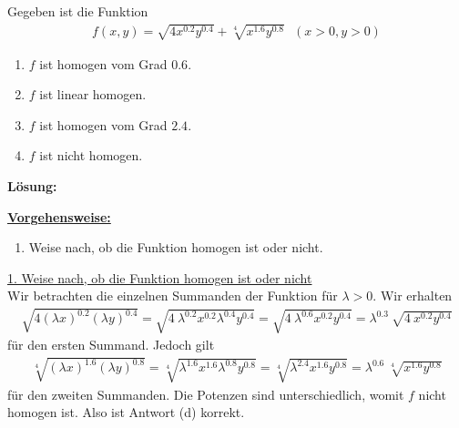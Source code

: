 \newpage

\subsection*{}
Gegeben ist die Funktion
\begin{align*}
f(x,y) = 
\sqrt{4  x^{0.2} y^{0.4}} + \sqrt[4]{x^{1.6} y^{0.8}}
\ \ \
(x>0, y>0)
\end{align*}
\renewcommand{\labelenumi}{(\alph{enumi})}
\begin{enumerate}
\item $f$ ist homogen vom Grad $0.6$.
\item $f$ ist linear homogen.
\item $f$ ist homogen vom Grad $2.4$.
\item $f$ ist nicht homogen.
\end{enumerate}

\textbf{Lösung:}
\begin{mdframed}
\underline{\textbf{Vorgehensweise:}}
\renewcommand{\labelenumi}{\theenumi.}
\begin{enumerate}
\item Weise nach, ob die Funktion homogen ist oder nicht.
\end{enumerate}
\end{mdframed}

\underline{1. Weise nach, ob die Funktion homogen ist oder nicht}\\
Wir betrachten die einzelnen Summanden der Funktion für $\lambda > 0$. Wir erhalten
\begin{align*}
\sqrt{4 (\lambda x)^{0.2} (\lambda y)^{0.4}}
= \sqrt{4 \ \lambda^{0.2} x^{0.2} \lambda^{0.4} y^{0.4}}
= \sqrt{4 \ \lambda^{0.6} x^{0.2}  y^{0.4}}
= \lambda^{0.3} \ \sqrt{4 \  x^{0.2}  y^{0.4}}
\end{align*}
für den ersten Summand.
Jedoch gilt
\begin{align*}
\sqrt[4]{(\lambda x)^{1.6} (\lambda y)^{0.8}}
=
\sqrt[4]{\lambda^{1.6} x^{1.6} \lambda^{0.8} y^{0.8}}
=
\sqrt[4]{\lambda^{2.4} x^{1.6} y^{0.8}}
=
\lambda^{0.6} \ \sqrt[4]{ x^{1.6} y^{0.8}}
\end{align*}	
für den zweiten Summanden.
Die Potenzen sind unterschiedlich, womit $f$ nicht homogen ist.
Also ist Antwort (d) korrekt.

\newpage

